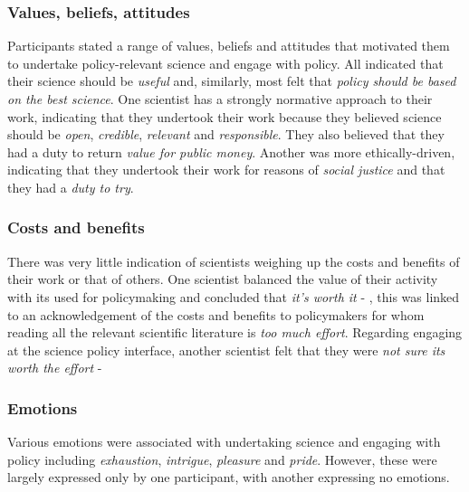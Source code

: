 \subsubsection{Values, beliefs, attitudes}\label{sec:resismvalues}
Participants stated a range of values, beliefs and attitudes that motivated them to undertake policy-relevant science and engage with policy. All indicated that their science should be \emph{useful} and, similarly, most felt that \emph{policy should be based on the best science}. One scientist has a strongly normative approach to their work, indicating that they undertook their work because they believed science should be \emph{open}, \emph{credible}, \emph{relevant} and \emph{responsible}. They also believed that they had a duty to return \emph{value for public money}. Another was more ethically-driven, indicating that they undertook their work for reasons of \emph{social justice} and that they had a \emph{duty to try}.  

\subsubsection{Costs and benefits}\label{sec:resismcab}
There was very little indication of scientists weighing up the costs and benefits of their work or that of others. One scientist balanced the value of their activity with its used for policymaking and concluded that \emph{it's worth it} - , this was linked to an acknowledgement of the costs and benefits to policymakers for whom reading all the relevant scientific literature is \emph{too much effort}. Regarding engaging at the science policy interface, another scientist felt that they were \emph{not sure its worth the effort} - 
\subsubsection{Emotions}\label{sec:resismemotions}
Various emotions were associated with undertaking science and engaging with policy including \emph{exhaustion}, \emph{intrigue}, \emph{pleasure} and \emph{pride}. However, these were largely expressed only by one participant, with another expressing no emotions.


